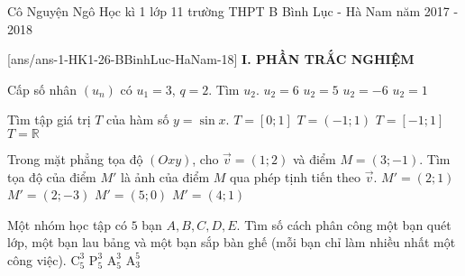 	\begin{name}
		{Cô Nguyện Ngô}
		{Học kì 1 lớp 11 trường THPT B Bình Lục - Hà Nam năm 2017 - 2018 }
	\end{name}
	\setcounter{ex}{0}\setcounter{bt}{0}
	[ans/ans-1-HK1-26-BBinhLuc-HaNam-18]
\noindent\textbf{I. PHẦN TRẮC NGHIỆM}
\begin{ex}%
Cấp số nhân $(u_n)$ có $u_1=3$, $q=2$. Tìm $u_2$.
	\choice
	{\True $u_2=6$}
	{$u_2=5$}
	{$u_2=-6$}
	{$u_2=1$}
\end{ex}

\begin{ex}%
Tìm tập giá trị $T$ của hàm số $y=\sin x$.	
	\choice
	{$T=[0; 1]$}
	{$T=(-1; 1)$}
	{\True $T=[-1; 1]$}
	{$T=\mathbb{R}$}
\end{ex}

\begin{ex}%
Trong mặt phẳng tọa độ $(Oxy)$, cho $\vec{v}=(1; 2)$ và điểm $M=(3; -1)$. Tìm tọa độ của điểm $M'$ là ảnh của điểm $M$ qua phép tịnh tiến theo $\vec{v}$.
	\choice
	{$M'=(2; 1)$}
	{$M'=(2; -3)$}
	{$M'=(5; 0)$}
	{\True $M'=(4; 1)$}
\end{ex}

\begin{ex}%
Một nhóm học tập có $5$ bạn $A, B, C, D, E$. Tìm số cách phân công một bạn quét lớp, một bạn lau bảng và một bạn sắp bàn ghế (mỗi bạn chỉ làm nhiều nhất một công việc).
	\choice
	{$\mathrm{C}^3_5$}
	{$\mathrm{P}^3_5$}
	{\True $\mathrm{A}^3_5$}
	{$\mathrm{A}^5_3$}
\end{ex}

